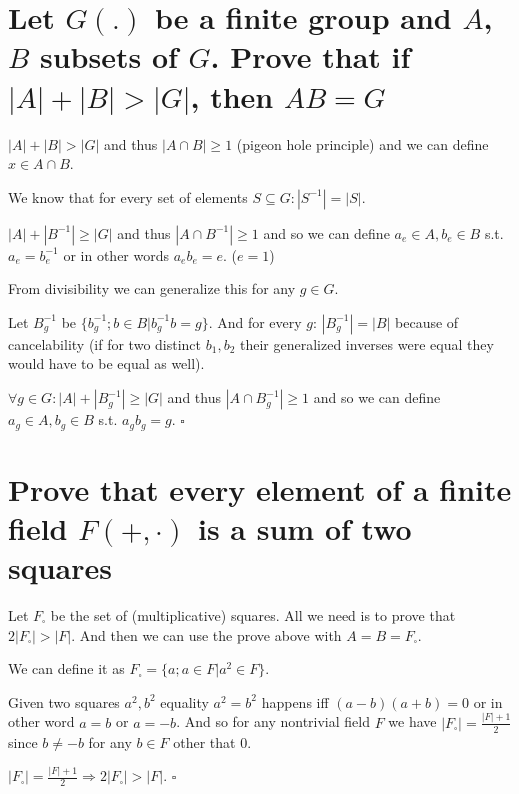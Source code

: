 \documentclass[11pt]{article}
\begin{document}
    \part*{Let $G(.)$ be a finite group and $A$, $B$ subsets of $G$.
    Prove that if $|A|+|B|>|G|$, then $AB = G$}

    $|A| + |B| > |G|$ and thus $|A \cap B| \geq 1$ (pigeon hole principle) and we can define $x \in A \cap B$.

    We know that for every set of elements $S \subseteq G: |S^{-1}| = |S|$.

    $|A| + |B^{-1}| \geq |G|$ and thus $|A \cap B^{-1}| \geq 1$ and so we can define $a_e \in A, b_e \in B$ s.t. $a_e = b_e^{-1}$ or in other words $a_e b_e = e$. ($e = 1$)

    From divisibility we can generalize this for any $g \in G$.

    Let $B_g^{-1}$ be $\{b_g^{-1} ; b \in B | b_g^{-1} b = g\}$. And for every $g$: $|B_g^{-1}| = |B|$ because of cancelability (if for two distinct $b_1, b_2$ their generalized inverses were equal they would have to be equal as well).

    $\forall g \in G: |A| + |B_g^{-1}| \geq |G|$ and thus $|A \cap B_g^{-1}| \geq 1$ and so we can define $a_g \in A, b_g \in B$ s.t. $a_g b_g = g$. $\square$

    \part*{Prove that every element of a finite field $F(+,\cdot)$ is a sum of two squares}

    Let $F_\square$ be the set of (multiplicative) squares. All we need is to prove that $2|F_\square| > |F|$. And then we can use the prove above with $A = B = F_\square$.

    We can define it as $F_\square = \{a ; a \in F | a^2 \in F\}$.

    Given two squares $a^2, b^2$ equality  $a^2 = b^2$ happens iff
    $(a - b)(a + b) = 0$ or in other word $a = b$ or $a = -b$. And so for any nontrivial field $F$ we have $|F_\square| = \frac{|F|+1}{2}$ since $b \neq -b$ for any $b \in F$ other that $0$.

    $|F_\square| = \frac{|F|+1}{2} \Rightarrow 2|F_\square| > |F|$. $\square$
\end{document}
